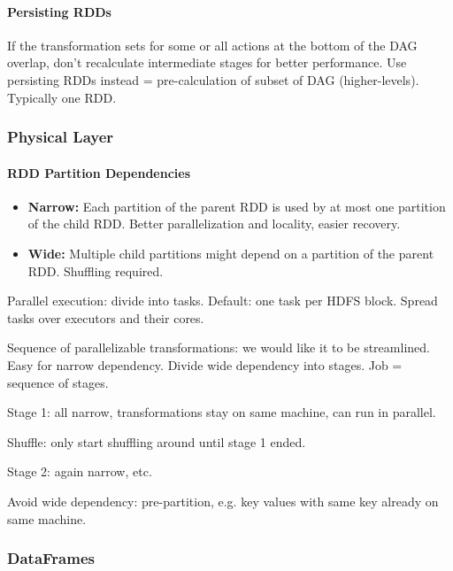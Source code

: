 
\paragraph{Persisting RDDs}
If the transformation sets for some or all actions at the bottom of the DAG overlap, don't recalculate intermediate stages for better performance. Use persisting RDDs instead = pre-calculation of subset of DAG (higher-levels). Typically one RDD. %



\subsubsection{Physical Layer}

\paragraph{RDD Partition Dependencies}
\begin{itemize}
    \item \textbf{Narrow:} Each partition of the parent RDD is used by at most one partition of the child RDD. Better parallelization and locality, easier recovery.
    \item \textbf{Wide:} Multiple child partitions might depend on a partition of the parent RDD. Shuffling required.
\end{itemize}




Parallel execution: divide into tasks. Default: one task per HDFS block. Spread tasks over executors and their cores.

Sequence of parallelizable transformations: we would like it to be streamlined. Easy for narrow dependency. Divide wide dependency into stages. Job = sequence of stages.

Stage 1: all narrow, transformations stay on same machine, can run in parallel.

Shuffle: only start shuffling around until stage 1 ended.

Stage 2: again narrow, etc.


Avoid wide dependency: pre-partition, e.g. key values with same key already on same machine.




\subsubsection{DataFrames}

